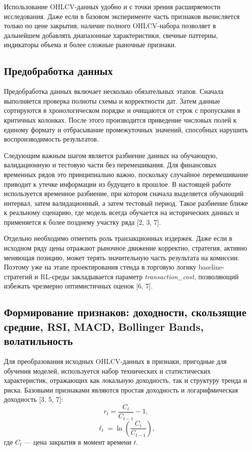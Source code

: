 Использование OHLCV-данных удобно и с точки зрения расширяемости исследования. Даже если в базовом эксперименте часть признаков вычисляется только по цене закрытия, наличие полного OHLCV-набора позволяет в дальнейшем добавлять диапазонные характеристики, свечные паттерны, индикаторы объема и более сложные рыночные признаки.

\subsection{Предобработка данных}

Предобработка данных включает несколько обязательных этапов. Сначала выполняется проверка полноты схемы и корректности дат. Затем данные сортируются в хронологическом порядке и очищаются от строк с пропусками в критичных колонках. После этого производится приведение числовых полей к единому формату и отбрасывание промежуточных значений, способных нарушить воспроизводимость результатов.

Следующим важным шагом является разбиение данных на обучающую, валидационную и тестовую части без перемешивания. Для финансовых временных рядов это принципиально важно, поскольку случайное перемешивание приводит к утечке информации из будущего в прошлое. В настоящей работе используется временное разбиение, при котором сначала выделяется обучающий интервал, затем валидационный, а затем тестовый период. Такое разбиение ближе к реальному сценарию, где модель всегда обучается на исторических данных и применяется к более позднему участку ряда [2, 3, 7].

Отдельно необходимо отметить роль транзакционных издержек. Даже если в исходном ряду цены отражают рыночное движение корректно, стратегия, активно меняющая позицию, может терять значительную часть результата на комиссии. Поэтому уже на этапе проектирования стенда в торговую логику baseline-стратегий и RL-среды закладывается параметр \textit{transaction\_cost}, позволяющий избежать чрезмерно оптимистичных оценок [6, 7].

\subsection{Формирование признаков: доходности, скользящие средние, RSI, MACD, Bollinger Bands, волатильность}

Для преобразования исходных OHLCV-данных в признаки, пригодные для обучения моделей, используется набор технических и статистических характеристик, отражающих как локальную доходность, так и структуру тренда и риска. Базовыми признаками являются простая доходность и логарифмическая доходность [3, 5, 7]:
\begin{equation}
r_t = \frac{C_t}{C_{t-1}} - 1,
\end{equation}
\begin{equation}
\ell_t = \ln\left(\frac{C_t}{C_{t-1}}\right),
\end{equation}
где $C_t$ — цена закрытия в момент времени $t$.

